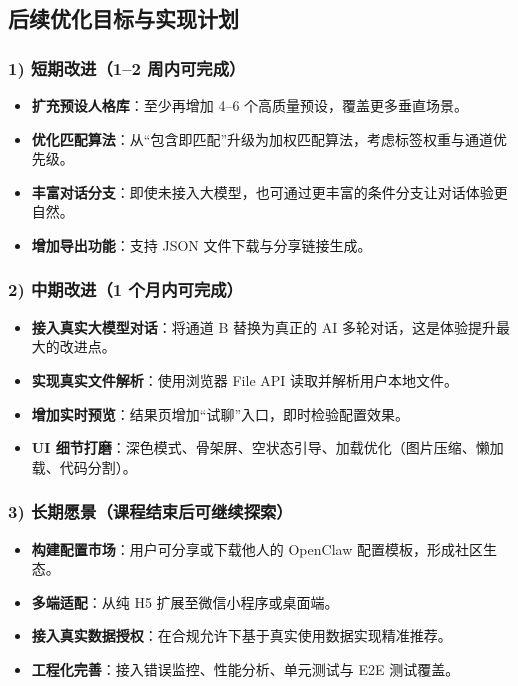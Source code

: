 \documentclass[11pt,a4paper]{ctexart}
\begin{document}
\subsection{后续优化目标与实现计划}

\subsubsection{1) 短期改进（1–2 周内可完成）}

\begin{itemize}
  \item \textbf{扩充预设人格库}：至少再增加 4–6 个高质量预设，覆盖更多垂直场景。
  \item \textbf{优化匹配算法}：从“包含即匹配”升级为加权匹配算法，考虑标签权重与通道优先级。
  \item \textbf{丰富对话分支}：即使未接入大模型，也可通过更丰富的条件分支让对话体验更自然。
  \item \textbf{增加导出功能}：支持 JSON 文件下载与分享链接生成。
\end{itemize}

\subsubsection{2) 中期改进（1 个月内可完成）}

\begin{itemize}
  \item \textbf{接入真实大模型对话}：将通道 B 替换为真正的 AI 多轮对话，这是体验提升最大的改进点。
  \item \textbf{实现真实文件解析}：使用浏览器 File API 读取并解析用户本地文件。
  \item \textbf{增加实时预览}：结果页增加“试聊”入口，即时检验配置效果。
  \item \textbf{UI 细节打磨}：深色模式、骨架屏、空状态引导、加载优化（图片压缩、懒加载、代码分割）。
\end{itemize}

\subsubsection{3) 长期愿景（课程结束后可继续探索）}

\begin{itemize}
  \item \textbf{构建配置市场}：用户可分享或下载他人的 OpenClaw 配置模板，形成社区生态。
  \item \textbf{多端适配}：从纯 H5 扩展至微信小程序或桌面端。
  \item \textbf{接入真实数据授权}：在合规允许下基于真实使用数据实现精准推荐。
  \item \textbf{工程化完善}：接入错误监控、性能分析、单元测试与 E2E 测试覆盖。
\end{itemize}
\end{document}
